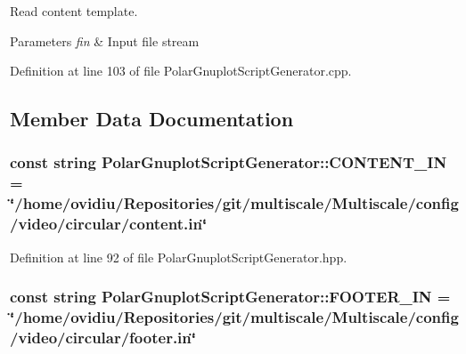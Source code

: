 \-Read content template. 


\begin{DoxyParams}{\-Parameters}
{\em fin} & \-Input file stream \\
\hline
\end{DoxyParams}


\-Definition at line 103 of file \-Polar\-Gnuplot\-Script\-Generator.\-cpp.



\subsection{\-Member \-Data \-Documentation}
\hypertarget{classmultiscale_1_1video_1_1PolarGnuplotScriptGenerator_ad8fb67fe439899d85924bd7339b7d08c}{
\subsubsection[{\-C\-O\-N\-T\-E\-N\-T\-\_\-\-I\-N}]{\setlength{\rightskip}{0pt plus 5cm}const string {\bf \-Polar\-Gnuplot\-Script\-Generator\-::\-C\-O\-N\-T\-E\-N\-T\-\_\-\-I\-N} = \char`\"{}/home/ovidiu/\-Repositories/git/multiscale/\-Multiscale/config/video/circular/content.\-in\char`\"{}}}\label{classmultiscale_1_1video_1_1PolarGnuplotScriptGenerator_ad8fb67fe439899d85924bd7339b7d08c}


\-Definition at line 92 of file \-Polar\-Gnuplot\-Script\-Generator.\-hpp.

\hypertarget{classmultiscale_1_1video_1_1PolarGnuplotScriptGenerator_aae225d7380fd7815efa1aed69087e6b0}{
\subsubsection[{\-F\-O\-O\-T\-E\-R\-\_\-\-I\-N}]{\setlength{\rightskip}{0pt plus 5cm}const string {\bf \-Polar\-Gnuplot\-Script\-Generator\-::\-F\-O\-O\-T\-E\-R\-\_\-\-I\-N} = \char`\"{}/home/ovidiu/\-Repositories/git/multiscale/\-Multiscale/config/video/circular/footer.\-in\char`\"{}}}\label{classmultiscale_1_1video_1_1PolarGnuplotScriptGenerator_aae225d7380fd7815efa1aed69087e6b0}


